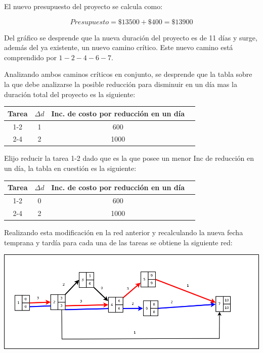 \documentclass[a4paper,10pt]{article}
\begin{document}
El nuevo presupuesto del proyecto se calcula como:

$$ Presupuesto = \$13500 + \$400 = \$13900 $$

Del gr\'afico se desprende que la nueva duraci\'on del proyecto es de 11 d\'ias y surge, adem\'as del ya existente, un nuevo camino cr\'itico. Este nuevo camino est\'a
comprendido por $1-2-4-6-7$.

Analizando ambos caminos cr\'iticos en conjunto, se desprende que la tabla sobre la que debe analizarse la posible reducci\'on para disminuir en un d\'ia mas la duraci\'on total del proyecto es la siguiente:

   \begin{center}
   \begin{tabular}{|| c | c | c | c ||}
   \hline 
      Tarea & $\Delta d$ & Inc. de costo por reducci\'on en un d\'ia \\ \hline \hline
      1-2 & 1 & 600  \\ \hline
      2-4 & 2 & 1000  \\ \hline
   \end{tabular}
   \end{center}

Elijo reducir la tarea 1-2 dado que es la que posee un menor Inc de reducci\'on en un d\'ia, la tabla en cuesti\'on es la siguiente:

   \begin{center}
   \begin{tabular}{|| c | c | c | c ||}
   \hline 
      Tarea & $\Delta d$ & Inc. de costo por reducci\'on en un d\'ia \\ \hline \hline
      1-2 & 0 & 600  \\ \hline
      2-4 & 2 & 1000  \\ \hline
   \end{tabular}
   \end{center}


Realizando esta modificaci\'on en la red anterior y recalculando la nueva fecha temprana y tard\'ia para cada una de las tareas se obtiene la siguiente red:

  \begin{center}
    \includegraphics[scale=0.4,keepaspectratio=true]{img/ej5-2red.png} 
  \end{center}
\end{document}

